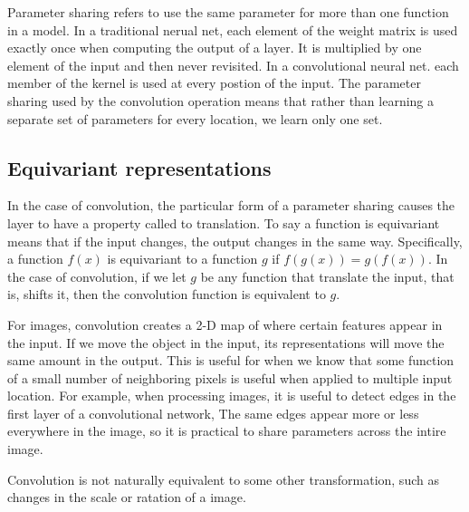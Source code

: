 Parameter sharing refers to use the same parameter for more than one function in a model.
In a traditional nerual net, each element of the weight matrix is used exactly once when computing the output of a layer.
It is multiplied by one element of the input and then never revisited.
In a convolutional neural net. each member of the kernel is used at every postion of the input.
The parameter sharing used by the convolution operation means that rather than learning a separate set of parameters for every location, we learn only one set.

\subsection{Equivariant representations}

In the case of convolution, the particular form of a parameter sharing causes the layer to have a property called  to translation.
To say a function is equivariant means that if the input changes, the output changes in the same way.
Specifically, a function $f(x)$ is equivariant to a function $g$ if $f(g(x)) = g(f(x))$.
In the case of convolution, if we let $g$ be any function that translate the input, that is, shifts it, then the convolution function is equivalent to $g$.

For images, convolution creates a 2-D map of where certain features appear in the input.
If we move the object in the input, its representations will move the same amount in the output.
This is useful for when we know that some function of a small number of neighboring pixels is useful when applied to multiple input location.
For example, when processing images, it is useful to detect edges in the first layer of a convolutional network,
The same edges appear more or less everywhere in the image, so it is practical to share parameters across the intire image.

Convolution is not naturally equivalent to some other transformation, such as changes in the scale or ratation of a image.




